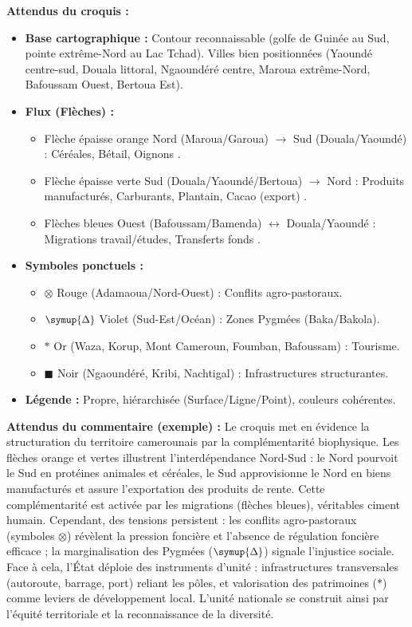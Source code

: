 \documentclass[11pt]{article}
\def\triangle{\mathord{\scalebox{0.9}{$\symup{\Delta}$}}}%
\def\star{\mathbin{\ast}}\def\bigstar{\mathord{\ast}}%
\begin{document}
\begin{corrige}
\textbf{Attendus du croquis :}
\begin{itemize}
    \item \textbf{Base cartographique :} Contour reconnaissable (golfe de Guinée au Sud, pointe extrême-Nord au Lac Tchad). Villes bien positionnées (Yaoundé centre-sud, Douala littoral, Ngaoundéré centre, Maroua extrême-Nord, Bafoussam Ouest, Bertoua Est).
    \item \textbf{Flux (Flèches) :} 
    \begin{itemize}
        \item Flèche épaisse \textcolor{poporange}{orange} Nord (Maroua/Garoua) $\to$ Sud (Douala/Yaoundé) : \og Céréales, Bétail, Oignons \fg.
        \item Flèche épaisse \textcolor{popgreen}{verte} Sud (Douala/Yaoundé/Bertoua) $\to$ Nord : \og Produits manufacturés, Carburants, Plantain, Cacao (export) \fg.
        \item Flèches \textcolor{popblue}{bleues} Ouest (Bafoussam/Bamenda) $\leftrightarrow$ Douala/Yaoundé : \og Migrations travail/études, Transferts fonds \fg.
    \end{itemize}
    \item \textbf{Symboles ponctuels :} 
    \begin{itemize}
        \item $\otimes$ Rouge (Adamaoua/Nord-Ouest) : Conflits agro-pastoraux.
        \item $\triangle$ Violet (Sud-Est/Océan) : Zones Pygmées (Baka/Bakola).
        \item $\star$ Or (Waza, Korup, Mont Cameroun, Foumban, Bafoussam) : Tourisme.
        \item $\blacksquare$ Noir (Ngaoundéré, Kribi, Nachtigal) : Infrastructures structurantes.
    \end{itemize}
    \item \textbf{Légende :} Propre, hiérarchisée (Surface/Ligne/Point), couleurs cohérentes.
\end{itemize}
\textbf{Attendus du commentaire (exemple) :}
\og Le croquis met en évidence la structuration du territoire camerounais par la complémentarité biophysique. Les flèches orange et vertes illustrent l'interdépendance Nord-Sud : le Nord pourvoit le Sud en protéines animales et céréales, le Sud approvisionne le Nord en biens manufacturés et assure l'exportation des produits de rente. Cette complémentarité est activée par les migrations (flèches bleues), véritables ciment humain. Cependant, des tensions persistent : les conflits agro-pastoraux (symboles $\otimes$) révèlent la pression foncière et l'absence de régulation foncière efficace ; la marginalisation des Pygmées ($\triangle$) signale l'injustice sociale. Face à cela, l'État déploie des instruments d'unité : infrastructures transversales (autoroute, barrage, port) reliant les pôles, et valorisation des patrimoines ($\star$) comme leviers de développement local. L'unité nationale se construit ainsi par l'équité territoriale et la reconnaissance de la diversité. \fg
\end{corrige}
\end{document}
